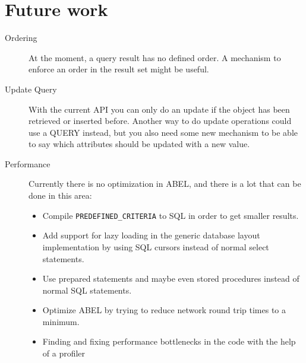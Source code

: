 \section{Future work}
\begin{description}
 \item [Ordering] At the moment, a query result has no defined order. A mechanism to enforce an order in the result set might be useful.
 \item [Update Query] With the current API you can only do an update if the object has been retrieved or inserted before. 
Another way to do update operations could use a QUERY instead, but you also need some new mechanism to be able to say which attributes should be updated with a new value.
 \item [Performance] Currently there is no optimization in ABEL, and there is a lot that can be done in this area:
 \begin{itemize}
  \item Compile \lstinline!PREDEFINED_CRITERIA! to SQL in order to get smaller results.
 \item Add support for lazy loading in the generic database layout implementation by using SQL cursors instead of normal select statements.
 \item Use prepared statements and maybe even stored procedures instead of normal SQL statements.
 \item Optimize ABEL by trying to reduce network round trip times to a minimum.
 \item Finding and fixing performance bottlenecks in the code with the help of a profiler
\end{itemize}


\end{description}
